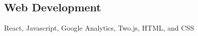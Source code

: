 \documentclass[../Resume.tex]{subfiles}
\begin{document}
	\subsection{Web Development}
	React, Javascript, Google Analytics, Two.js, HTML, and CSS
	\vspace*{-4mm}
\end{document}
